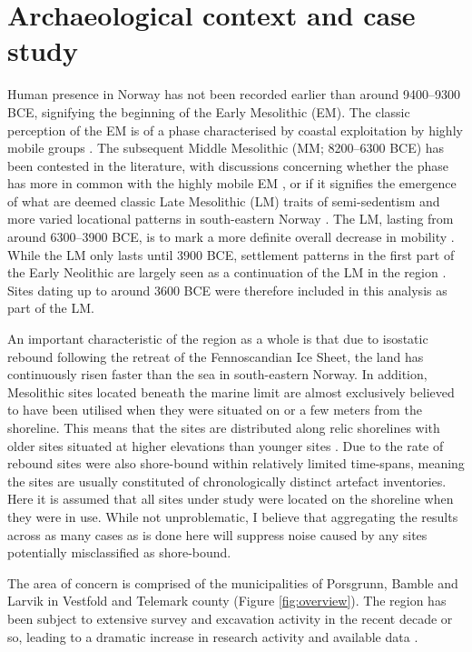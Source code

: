 \documentclass[12pt, a4paper]{article}
\begin{document}
\section{Archaeological context and case study}
Human presence in Norway has not been recorded earlier than around 9400--9300 BCE, signifying the beginning of the Early Mesolithic (EM). The classic perception of the EM is of a phase characterised by coastal exploitation by highly mobile groups \citep[e.g.][]{bjerck2008, fuglestvedt2012}. The subsequent Middle Mesolithic (MM; 8200--6300 BCE) has been contested in the literature, with discussions concerning whether the phase has more in common with the highly mobile EM \citep{mansrud2014}, or if it signifies the emergence of what are deemed classic Late Mesolithic (LM) traits of semi-sedentism and more varied locational patterns in south-eastern Norway \citep{solheim2016}. The LM, lasting from around 6300--3900 BCE, is to mark a more definite overall decrease in mobility \citep{bjerck2008, glorstad2010}. While the LM only lasts until 3900 BCE, settlement patterns in the first part of the Early Neolithic are largely seen as a continuation of the LM in the region \citep{glorstad2009}. Sites dating up to around 3600 BCE were therefore included in this analysis as part of the LM. \par
An important characteristic of the region as a whole is that due to isostatic rebound following the retreat of the Fennoscandian Ice Sheet, the land has continuously risen faster than the sea in south-eastern Norway. In addition, Mesolithic sites located beneath the marine limit are almost exclusively believed to have been utilised when they were situated on or a few meters from the shoreline. This means that the sites are distributed along relic shorelines with older sites situated at higher elevations than younger sites \citep{breivik2018, solheim2020}. Due to the rate of rebound sites were also shore-bound within relatively limited time-spans, meaning the sites are usually constituted of chronologically distinct artefact inventories. Here it is assumed that all sites under study were located on the shoreline when they were in use. While not unproblematic, I believe that aggregating the results across as many cases as is done here will suppress noise caused by any sites potentially misclassified as shore-bound. \par
The area of concern is comprised of the municipalities of Porsgrunn, Bamble and Larvik in Vestfold and Telemark county (Figure \ref{fig:overview}). The region has been subject to extensive survey and excavation activity in the recent decade or so, leading to a dramatic increase in research activity and available data \citep[e.g.][]{solheim2013, jaksland2014, melvold2014, reitan2014, solheim2017}.
\end{document}
